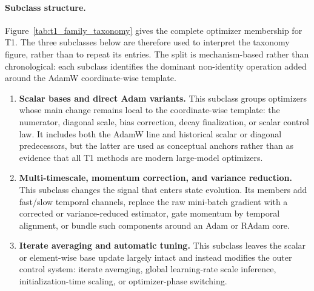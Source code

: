 \paragraph{Subclass structure.}
Figure~\ref{tab:t1_family_taxonomy} gives the complete optimizer membership for
T1.  The three subclasses below are therefore used to interpret the taxonomy
figure, rather than to repeat its entries.  The split is mechanism-based
rather than chronological: each subclass identifies the dominant non-identity
operation added around the AdamW coordinate-wise template.
\begin{enumerate}[label=\textbf{T1.\arabic*},leftmargin=*,itemsep=2pt]
  \item \textbf{Scalar bases and direct Adam variants.}
  This subclass groups optimizers whose main change remains local to the
  coordinate-wise template: the numerator, diagonal scale, bias correction,
  decay finalization, or scalar control law.  It includes both the AdamW line
  and historical scalar or diagonal predecessors, but the latter are used as
  conceptual anchors rather than as evidence that all T1 methods are modern
  large-model optimizers.
  \item \textbf{Multi-timescale, momentum correction, and variance reduction.}
  This subclass changes the signal that enters state evolution.  Its members
  add fast/slow temporal channels, replace the raw mini-batch gradient with a
  corrected or variance-reduced estimator, gate momentum by temporal
  alignment, or bundle such components around an Adam or RAdam core.
  \item \textbf{Iterate averaging and automatic tuning.}
  This subclass leaves the scalar or element-wise base update largely intact
  and instead modifies the outer control system: iterate averaging, global
  learning-rate scale inference, initialization-time scaling, or
  optimizer-phase switching.
\end{enumerate}

